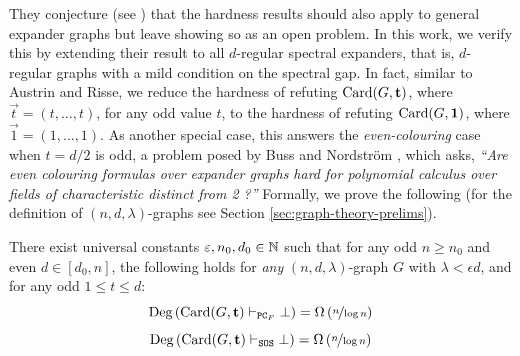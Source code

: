 \documentclass[11pt]{article}
\begin{document}
They conjecture (see \citep[Section 6]{Austrin_2022}) that the hardness results should also apply to general expander graphs but leave showing so as an open problem.
In this work, we verify this by extending their result to all $d$-regular spectral expanders, that is, $d$-regular graphs with a mild condition on the spectral gap.
In fact, similar to Austrin and Risse, we reduce the hardness of refuting $\text{Card}(G, \mathbf{t})$, where $\vec{t} = (t, \ldots, t)$, for any odd value $t$, to the hardness of refuting $\text{Card}(G, \mathbf{1})$, where $\vec{1} = (1, \ldots, 1)$.
As another special case, this answers the \emph{even-colouring} case when $t = d/2$ is odd, a problem posed by Buss and Nordstr\"{o}m \citep[Open Problem 7.7]{buss2021proof}, which asks, \textit{``Are even colouring formulas over expander graphs hard for polynomial calculus over fields of characteristic distinct from 2 ?''}
Formally, we prove the following (for the definition of $(n, d, \lambda)$-graphs see Section \ref{sec:graph-theory-prelims}).


\begin{theorem}\label{thm:general-hardness-result}

  There exist universal constants $\varepsilon, n_0, d_0 \in \mathbb{N}$ such that for any odd $n \ge n_0$ and even $d \in [d_0, n]$, the following holds for \emph{any} $(n, d, \lambda)$-graph $G$ with $\lambda < \epsilon d$, and for any odd $1 \leq t \leq d$:  
  \[ \text{Deg}\left(\text{Card}(G, \mathbf{t}) \vdash_{\texttt{PC}_F} \bot\right) = \Omega\left(\nicefrac{n}{\log n}\right)\]
  \[ \text{Deg}\left(\text{Card}(G, \mathbf{t}) \vdash_{\texttt{SOS}} \bot\right) = \Omega\left(\nicefrac{n}{\log n}\right)\]  
\end{theorem}
\end{document}
